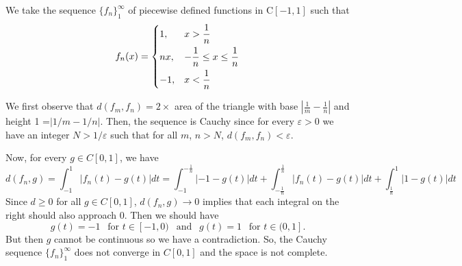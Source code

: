 
\begin{solution}
    We take the sequence $\{f_n\}_1^\infty$
    of piecewise defined functions in $\text{C}[-1,1]$
    such that
    $$f_n(x)=
    \begin{dcases}
        1,   & x>\frac{1}{n}\\
        nx,  & -\frac{1}{n}\leq x\leq \frac{1}{n}\\
        -1,  & x<\frac{1}{n}
    \end{dcases}$$

    We  first observe that
    $d(f_m,f_n)=2 \times$ area of the
    triangle with base $\left|\frac{1}{m}-
    \frac{1}{n}\right|$ and height 1
    =$\left|1/m-1/n\right|$. Then,
    the sequence is Cauchy
    since for every $\varepsilon>0$ we have
    an integer $N>1/\varepsilon$ such that
    for all $m$, $n>N$,
    $d(f_m,f_n)<\varepsilon$.

    \vspace*{3mm}
    Now, for every $g\in C[0,1]$, we have
    $$d(f_n,g)=\int_{-1}^1{|f_n(t) - g(t)|} dt
    = \int_{-1}^{-\frac{1}{n}}{|-1-g(t)|dt}
    + \int_{-\frac{1}{n}}^{\frac{1}{n}}
    {|f_n(t)-g(t)|dt}
    + \int_{{\frac{1}{n}}}^1{|1-g(t)|dt}$$
    Since $d\geq 0$ for all $g\in C[0,1]$,
    $d(f_n,g)\to 0$ implies that each
    integral on the right should also approach
    0. Then we should have
    $$g(t)=-1\ \ \text{ for }t\in [-1,0)
    \ \ \text{ and }\ \
    g(t)=1\ \ \text{ for }t\in (0,1].$$
    But then $g$ cannot be continuous so we have
    a contradiction. So, the Cauchy sequence
    $\{f_n\}_1^\infty$ does not converge in
    $C[0,1]$ and the space is not complete.
\end{solution}